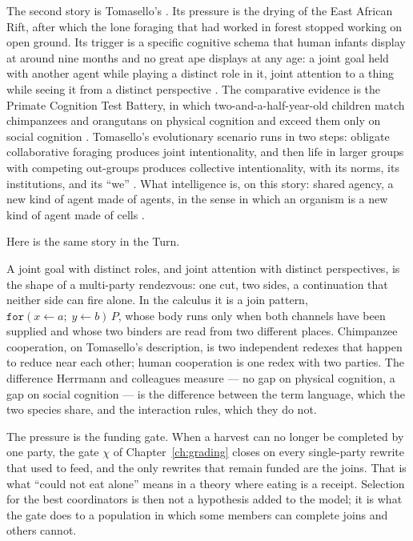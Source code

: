 The second story is Tomasello's \cite{tomasello2005,tomasello2008,tomasello2019,tomasello2025}. Its pressure is the drying of the East African Rift, after which the lone foraging that had worked in forest stopped working on open ground. Its trigger is a specific cognitive schema that human infants display at around nine months and no great ape displays at any age: a joint goal held with another agent while playing a distinct role in it, joint attention to a thing while seeing it from a distinct perspective \cite{carpenter1998}. The comparative evidence is the Primate Cognition Test Battery, in which two-and-a-half-year-old children match chimpanzees and orangutans on physical cognition and exceed them only on social cognition \cite{herrmann2007}. Tomasello's evolutionary scenario runs in two steps: obligate collaborative foraging produces joint intentionality, and then life in larger groups with competing out-groups produces collective intentionality, with its norms, its institutions, and its ``we'' \cite{tomasello2012}. What intelligence is, on this story: shared agency, a new kind of agent made of agents, in the sense in which an organism is a new kind of agent made of cells \cite{tomasello2022}.

Here is the same story in the Turn.

\begin{observation}
\label{st:obs:join}
A joint goal with distinct roles, and joint attention with distinct perspectives, is the shape of a multi-party rendezvous: one cut, two sides, a continuation that neither side can fire alone. In the calculus it is a join pattern, $\mathtt{for}(x \leftarrow a;\; y \leftarrow b)\,P$, whose body runs only when both channels have been supplied and whose two binders are read from two different places. Chimpanzee cooperation, on Tomasello's description, is two independent redexes that happen to reduce near each other; human cooperation is one redex with two parties. The difference Herrmann and colleagues measure --- no gap on physical cognition, a gap on social cognition --- is the difference between the term language, which the two species share, and the interaction rules, which they do not.
\end{observation}

\noindent
The pressure is the funding gate. When a harvest can no longer be completed by one party, the gate $\chi$ of Chapter~\ref{ch:grading} closes on every single-party rewrite that used to feed, and the only rewrites that remain funded are the joins. That is what ``could not eat alone'' means in a theory where eating is a receipt. Selection for the best coordinators is then not a hypothesis added to the model; it is what the gate does to a population in which some members can complete joins and others cannot.

